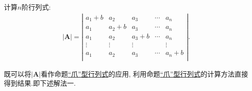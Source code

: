 \documentclass[../../main.tex]{subfiles}
\begin{document}
\begin{example}
计算$n$阶行列式:
\begin{equation}
\begin{split}
|\boldsymbol{A}|=\left| \begin{matrix}
a_1+b&		a_2&		a_3&		\cdots&		a_n\\
a_1&		a_2+b&		a_3&		\cdots&		a_n\\
a_1&		a_2&		a_3+b&		\cdots&		a_n\\
\vdots&		\vdots&		\vdots&		&		\vdots\\
a_1&		a_2&		a_3&		\cdots&		a_n+b\\
\end{matrix} \right|.
\end{split}
\nonumber
\end{equation}
\begin{note}
既可以将$|\boldsymbol{A}|$看作命题\hyperref["爪"型行列式]{“爪”型行列式}的应用,
利用命题\hyperref["爪"型行列式]{“爪”型行列式}的计算方法直接得到结果.即下述解法一.


\end{note}
\end{example}
\end{document}
